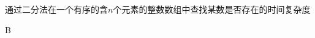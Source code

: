 \documentclass{myMacExam}
\begin{document}
\begin{problems}
\qu 通过二分法在一个有序的含$n$个元素的整数数组中查找某数是否存在的时间复杂度是\t
{}
\begin{solution}B\end{solution}
\end{problems}  
\end{document}
